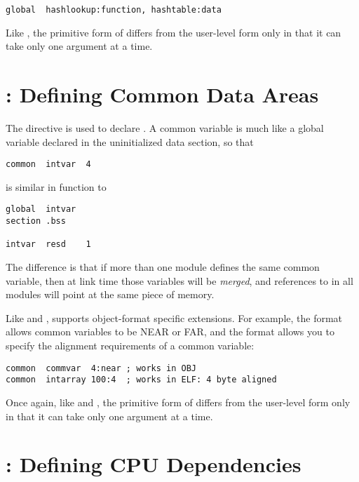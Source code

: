 \begin{lstlisting}
global  hashlookup:function, hashtable:data
\end{lstlisting}

Like , the primitive form of  differs
from the user-level form only in that it can take only one argument
at a time.

\section{: Defining Common Data Areas}
\label{sec:common}

The  directive is used to declare . A common variable is much like a global variable declared
in the uninitialized data section, so that

\begin{lstlisting}
common  intvar  4
\end{lstlisting}

is similar in function to

\begin{lstlisting}
global  intvar
section .bss

intvar  resd    1
\end{lstlisting}

The difference is that if more than one module defines the same
common variable, then at link time those variables will be
\emph{merged}, and references to  in all modules
will point at the same piece of memory.

Like  and ,  supports
object-format specific extensions. For example, the 
format allows common variables to be NEAR or FAR, and the 
format allows you to specify the alignment requirements of
a common variable:

\begin{lstlisting}
common  commvar  4:near ; works in OBJ
common  intarray 100:4  ; works in ELF: 4 byte aligned
\end{lstlisting}

Once again, like  and , the primitive form of
 differs from the user-level form only in that it can take
only one argument at a time.

\section{: Defining CPU Dependencies}
\label{sec:cpu}

